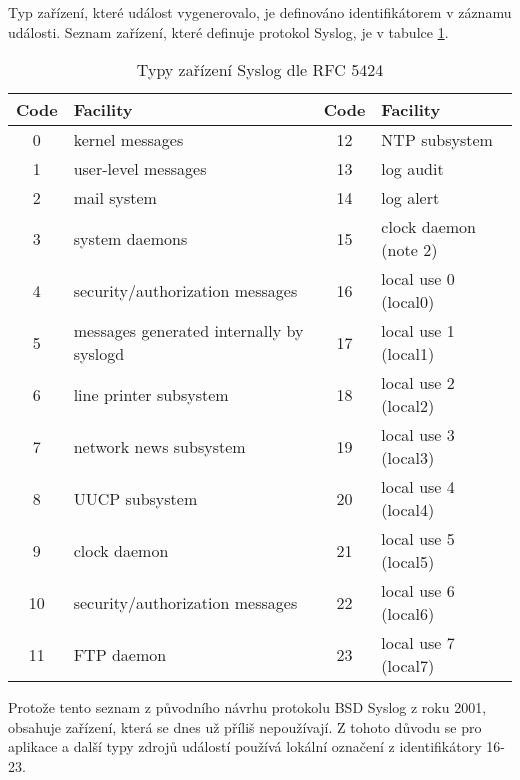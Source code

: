 Typ zařízení, které událost vygenerovalo, je definováno identifikátorem v záznamu události. Seznam zařízení, které definuje protokol Syslog, je v tabulce \ref{tab:facility}. 
\begin{table}[h]
  \centering
  \small
  \begin{tabular}{|c|l|c|l|}
    \hline
    \bf Code & \bf Facility & \bf Code & \bf Facility\\
    \hline
     0  &  kernel messages                             &  12 &  NTP subsystem           \\
     1  &  user-level messages                         &  13 &   log audit              \\
     2  &  mail system                                 &  14 &   log alert              \\
     3  &  system daemons                              &  15 &   clock daemon (note 2)  \\
     4  &  security/authorization messages             &  16 &   local use 0  (local0)  \\
     5  &  messages generated internally by syslogd    &  17 &   local use 1  (local1)  \\
     6  &  line printer subsystem                      &  18 &   local use 2  (local2)  \\
     7  &  network news subsystem                      &  19 &   local use 3  (local3)  \\
     8  &  UUCP subsystem                              &  20 &   local use 4  (local4)  \\
     9  &  clock daemon                                &  21 &   local use 5  (local5)  \\
     10 &  security/authorization messages             &  22 &   local use 6  (local6)  \\
     11 &  FTP daemon                                  &  23 &   local use 7  (local7)  \\
     \hline
  \end{tabular}
  \caption{Typy zařízení Syslog dle RFC 5424 \cite{rfc5424}}\label{tab:facility}
\end{table}
Protože tento seznam z původního  návrhu protokolu BSD Syslog z roku 2001, obsahuje zařízení, která se dnes už příliš nepoužívají. Z tohoto důvodu se pro aplikace a další typy zdrojů událostí používá lokální označení z identifikátory 16-23. 

